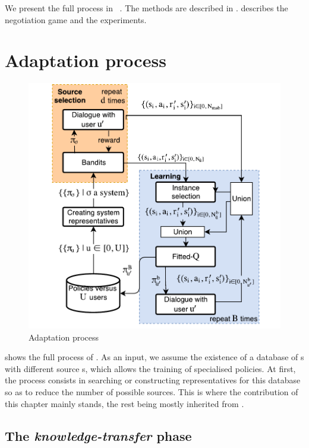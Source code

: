 We present the full  process in ~. The  methods are described in .  describes the negotiation game and the experiments.


\section{Adaptation process}
\label{sec:adapatationframework}

\begin{figure}[b!]
    \bigcentering
    \includegraphics[width=0.9\columnwidth]{sources/contribution/sigdial/dataflow.pdf}
    \caption{Adaptation process}
    \label{fig:adaptationframework}
\end{figure}


 shows the full process of . As an input, we assume the existence of a database of s with different source s, which allows the training of  specialised policies. At first, the process consists in searching or constructing  representatives for this database so as to reduce the number of possible  sources. This is where the contribution of this chapter mainly stands, the rest being mostly inherited from \textcite{Genevay2016}.

\subsection{The \textit{knowledge-transfer} phase}

